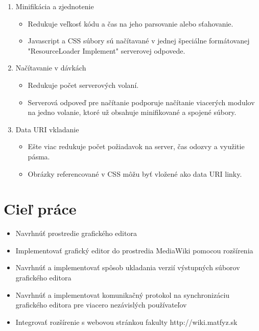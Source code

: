 \begin{enumerate}
	\item Minifikácia a zjednotenie
	\begin{itemize}
		\item Redukuje veľkosť kódu a čas na jeho parsovanie alebo sťahovanie. 
		\item Javascript a CSS súbory sú načítavané v jednej špeciálne formátovanej "ResourceLoader Implement" serverovej odpovede.
	\end{itemize}
	\item Načítavanie v dávkách
	\begin{itemize}
		\item Redukuje počet serverových volaní.
		\item Serverová odpoveď pre načítanie podporuje načítanie viacerých modulov na jedno volanie, ktoré už obsahuje minifikované a spojené súbory.
	\end{itemize}
	\item Data URI vkladanie
	\begin{itemize}
		\item Ešte viac redukuje počet požiadavok na server, čas odozvy a využitie pásma.
		\item Obrázky referencované v CSS môžu byť vložené ako data URI linky.
	\end{itemize}
\end{enumerate}


\section{Cieľ práce}
\begin{itemize}
	\item Navrhnúť prostredie grafického editora
	\item Implementovať grafický editor do prostredia MediaWiki pomocou rozšírenia
	\item Navrhnúť a implementovať spôsob ukladania verzií výstupných súborov grafického editora
	\item Navrhnúť a implementovat komunikačný protokol na synchronizáciu grafického editora pre viacero nezávislých používateľov
	\item Integrovať rozšírenie s webovou stránkou fakulty http://wiki.matfyz.sk
\end{itemize}